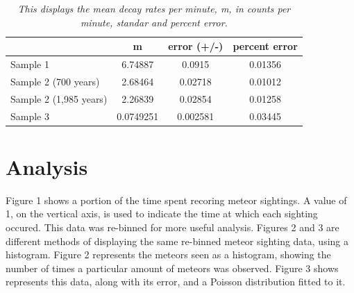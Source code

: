 \documentclass[11pt]{article}
\begin{document}
\begin{table}[H]
  \begin{center}
\begin{tabular}{|l|c|c|c|}
\hline
                       & \textbf{m} & \textbf{error (+/-)} & \textbf{percent error} \\ \hline
Sample 1               & 6.74887    & 0.0915               & 0.01356                \\ \hline
Sample 2 (700 years)   & 2.68464    & 0.02718              & 0.01012                \\ \hline
Sample 2 (1,985 years) & 2.26839    & 0.02854              & 0.01258                \\ \hline
Sample 3               & 0.0749251  & 0.002581             & 0.03445                \\ \hline
\end{tabular}
\caption{\it \small{This displays the mean decay rates per minute, m, in counts per minute, standar and percent error. \label{table1}}}
  \end{center}
\end{table}

\section{Analysis}

Figure 1 shows a portion of the time spent recoring meteor sightings.  A value of 1, on the vertical axis, is used to indicate 
the time at which each sighting occured.  This data was re-binned for more useful analysis.  Figures 2 and 3 are different 
methods of displaying the same re-binned meteor sighting data, using a histogram.  Figure 2 represents the meteors seen as a 
histogram, showing the number of times a particular amount of meteors was observed.  Figure 3 shows represents this data, 
along with its error, and a Poisson distribution fitted to it.
\end{document}
